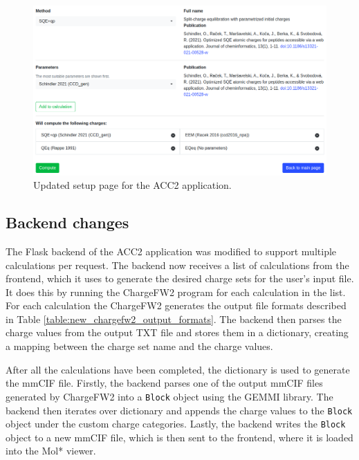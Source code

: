 \documentclass[
  digital,     %
  oneside,     %
  nosansbold,  %
  nocolorbold, %
  lof,         %
  lot,         %
]{fithesis4}
\begin{document}
\begin{figure}[htbp]
  \begin{center}
    \includegraphics[width=\textwidth]{figures/new_setup.png}
  \end{center}
  \caption{Updated setup page for the ACC2 application.}
  \label{fig:new_setup}
\end{figure}

\subsection{Backend changes}

The Flask backend of the ACC2 application was modified to support multiple calculations per request. The backend now receives a list of calculations from the frontend, which it uses to generate the desired charge sets for the user's input file. It does this by running the ChargeFW2 program for each calculation in the list. For each calculation the ChargeFW2 generates the output file formats described in Table \ref{table:new_chargefw2_output_formats}. The backend then parses the charge values from the output TXT file and stores them in a dictionary, creating a mapping between the charge set name and the charge values.

After all the calculations have been completed, the dictionary is used to generate the mmCIF file. Firstly, the backend parses one of the output mmCIF files generated by ChargeFW2 into a \texttt{Block} object using the GEMMI library. The backend then iterates over dictionary and appends the charge values to the \texttt{Block} object under the custom charge categories. Lastly, the backend writes the \texttt{Block} object to a new mmCIF file, which is then sent to the frontend, where it is loaded into the Mol* viewer.
\end{document}
